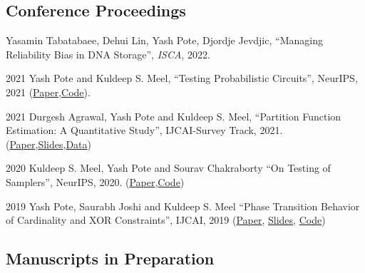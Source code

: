 \documentclass[12pt,letterpaper]{report}
\begin{document}
    \subsection*{Conference Proceedings}

    \begin{tablist}       
    	\item[\the\year] \tab  Yasamin Tabatabaee,  Dehui Lin, Yash Pote, Djordje Jevdjic, \enquote{Managing Reliability Bias in DNA Storage}, \textit{ISCA},  2022.
    			
    	\item[2021] \tab  Yash Pote  and Kuldeep S. Meel, \enquote{Testing Probabilistic Circuits},  {NeurIPS},  2021 (\href{https://www.comp.nus.edu.sg/~meel/Papers/neurips21-pm.pdf}{Paper},\href{https://github.com/meelgroup/teq}{Code}).
    	
    	\item[2021] \tab  Durgesh Agrawal, Yash Pote  and Kuldeep S. Meel, \enquote{Partition Function Estimation: A Quantitative Study}, IJCAI-Survey Track,  2021.(\href{https://arxiv.org/abs/2105.11132}{Paper},\href{https://meelgroup.github.io/publication/ijcai21_partition}{Slides},\href{https://doi.org/10.5281/zenodo.4769117}{Data})
    	
    	\item[2020] \tab Kuldeep S. Meel, Yash Pote  and Sourav Chakraborty \enquote{On Testing of Samplers}, NeurIPS, 2020. (\href{https://arxiv.org/abs/2010.12918}{Paper},\href{https://github.com/meelgroup/barbarik}{Code})
    	
    	
        \item[2019] \tab Yash Pote, Saurabh Joshi and Kuldeep S. Meel  \enquote{Phase Transition Behavior of Cardinality and
        XOR Constraints}, IJCAI, 2019 (\href{https://www.ijcai.org/proceedings/2019/0162.pdf}{Paper}, \href{https://meelgroup.github.io/files/slides/ijcai19pjm.pdf}{Slides}, \href{https://github.com/meelgroup/1-CARD-XOR/}{Code})
        

	
    \end{tablist}

    \subsection*{Manuscripts in Preparation}
\end{document}
